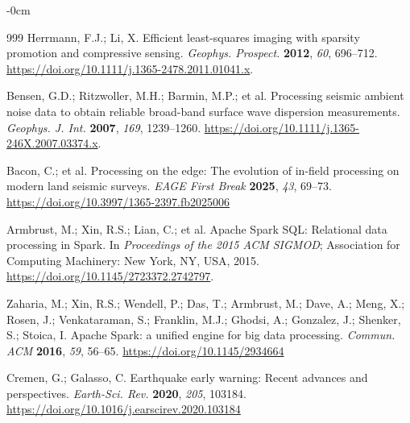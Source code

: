\documentclass[data,article,accept,pdftex,moreauthors]{Definitions/mdpi}
\begin{document}
\begin{adjustwidth}{-\extralength}{0cm}
\begin{thebibliography}{999}
Herrmann, F.J.; Li, X. Efficient least-squares imaging with sparsity promotion and compressive sensing. \emph{Geophys. Prospect.} \textbf{2012}, \emph{60}, 696--712. \url{https://doi.org/10.1111/j.1365-2478.2011.01041.x}.

Bensen, G.D.; Ritzwoller, M.H.; Barmin, M.P.; et al. Processing seismic ambient noise data to obtain reliable broad-band surface wave dispersion measurements. \emph{Geophys. J. Int.} \textbf{2007}, \emph{169}, 1239--1260. \url{https://doi.org/10.1111/j.1365-246X.2007.03374.x}.

Bacon, C.; et al. Processing on the edge: The evolution of in-field processing on modern land seismic surveys. \emph{EAGE First Break} \textbf{2025}, \emph{43}, 69--73. \url{https://doi.org/10.3997/1365-2397.fb2025006}

Armbrust, M.; Xin, R.S.; Lian, C.; et al. Apache Spark SQL: Relational data processing in Spark. In \emph{Proceedings of the 2015 ACM SIGMOD}; Association for Computing Machinery: New York, NY, USA,  %
 2015. \url{https://doi.org/10.1145/2723372.2742797}.

Zaharia, M.; Xin, R.S.; Wendell, P.; Das, T.; Armbrust, M.; Dave, A.; Meng, X.; Rosen, J.; Venkataraman, S.; Franklin, M.J.; Ghodsi, A.; Gonzalez, J.; Shenker, S.; Stoica, I. Apache Spark: a unified engine for big data processing. %
\emph{Commun. ACM} \textbf{2016}, \emph{59}, 56--65. \url{https://doi.org/10.1145/2934664}

Cremen, G.; Galasso, C. Earthquake early warning: Recent advances and perspectives. \emph{Earth-Sci. Rev.} \textbf{2020}, \emph{205}, 103184. \url{https://doi.org/10.1016/j.earscirev.2020.103184}

\end{thebibliography}
\PublishersNote{}

%

\end{adjustwidth}
\end{document}
